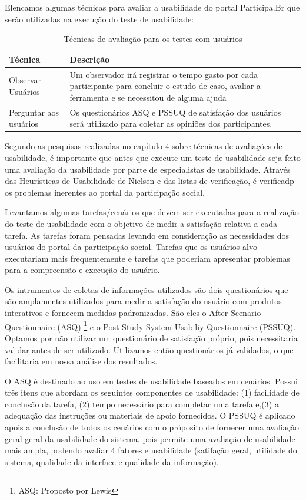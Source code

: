 Elencamos algumas técnicas para avaliar a usabilidade do portal Participa.Br que serão utilizadas na execução do teste de usabilidade:

\begin{table}[h]
\begin{tabular}{|l| p{10cm} |}
\hline
Técnica & Descrição \\ \hline
Observar Usuários & Um observador irá registrar o tempo 
gasto por cada participante para concluir o estudo de caso, 
avaliar a ferramenta e se necessitou de alguma ajuda    \\ \hline
Perguntar aos usuários & Os questionários ASQ e PSSUQ 
de satisfação dos usuários será utilizado 
para coletar as opiniões dos participantes.\\ \hline
\end{tabular}
\caption{Técnicas de avaliação para os testes com usuários}
\end{table}


Segundo as pesquisas realizadas no capítulo 4 sobre técnicas de avaliações de usabilidade, é importante que antes que execute um teste de usabilidade seja feito uma avaliação da usabilidade por parte de especialistas de usabilidade.
%
Através das Heurísticas de Usabilidade de Nielsen e das listas de verificação, é verificadp os problemas inerentes ao portal da participação social.

Levantamos algumas tarefas/cenários que devem ser executadas para a realização do teste de usabilidade com o objetivo de medir a satisfação relativa a cada tarefa. As tarefas foram pensadas levando em consideração as necessidades dos usuários do portal da participação social. Tarefas que os usuários-alvo executariam mais frequentemente e tarefas que poderiam apresentar problemas para a compreensão e execução do usuário. 

Os intrumentos de coletas de informações utilizados são dois questionários que são amplamentes utilizados para medir a satisfação do usuário com produtos interativos e fornecem medidas padronizadas.
%
São eles o After-Scenario Questionnaire (ASQ) \footnote{ASQ: Proposto por Lewis} e o Post-Study System Usabiliy Questionnaire (PSSUQ). 
%
Optamos por não utilizar um questionário de satisfação próprio, pois necessitaria validar antes de ser utilizado.  Utilizamos então questionários já validados, o que facilitaria em nossa análise dos resultados.

O ASQ é destinado ao uso em testes de usabilidade baseados em cenários. Possui três itens que abordam os seguintes componentes de usabilidade: (1) facilidade de conclusão da tarefa, (2) tempo necessário para completar uma tarefa e,(3) a adequação das instruções ou materiais de apoio fornecidos.
%
O PSSUQ é aplicado apois a conclusão de todos os cenários com o próposito de fornecer uma avaliação geral geral da usabilidade do sistema. pois permite uma avaliação de usabilidade mais ampla, podendo avaliar 4 fatores e usabilidade (satifação geral, utilidade do sistema, qualidade da interface e qualidade da informação). 

